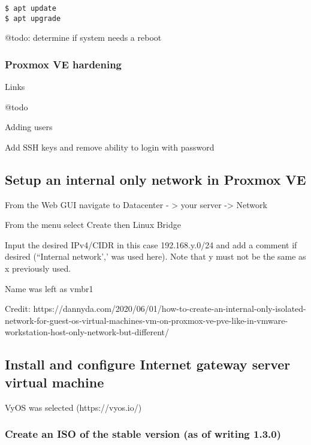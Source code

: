 \begin{verbatim}
$ apt update
$ apt upgrade
\end{verbatim}

@todo: determine if system needs a reboot

\hypertarget{proxmox-ve-hardening}{%
\subsubsection{Proxmox VE hardening}\label{proxmox-ve-hardening}}

Links

@todo

Adding users

Add SSH keys and remove ability to login with password

\hypertarget{setup-an-internal-only-network-in-proxmox-ve}{%
\subsection{Setup an internal only network in Proxmox
VE}\label{setup-an-internal-only-network-in-proxmox-ve}}

From the Web GUI navigate to Datacenter - \textgreater{} your server
-\textgreater{} Network

From the menu select Create then Linux Bridge

Input the desired IPv4/CIDR in this case 192.168.y.0/24 and add a
comment if desired (``Internal network',' was used here). Note that y
must not be the same as x previously used.

Name was left as vmbr1

Credit:
https://dannyda.com/2020/06/01/how-to-create-an-internal-only-isolated-network-for-guest-os-virtual-machines-vm-on-proxmox-ve-pve-like-in-vmware-workstation-host-only-network-but-different/

\hypertarget{install-and-configure-internet-gateway-server-virtual-machine}{%
\subsection{Install and configure Internet gateway server virtual
machine}\label{install-and-configure-internet-gateway-server-virtual-machine}}

VyOS was selected (https://vyos.io/)

\hypertarget{create-an-iso-of-the-stable-version-as-of-writing-1.3.0}{%
\subsubsection{Create an ISO of the stable version (as of writing
1.3.0)}\label{create-an-iso-of-the-stable-version-as-of-writing-1.3.0}}

